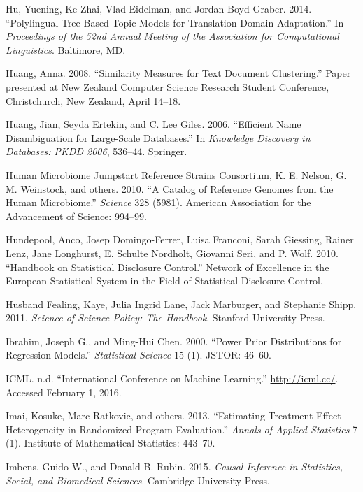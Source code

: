\documentclass[]{krantz}
\begin{document}
\hypertarget{ref-Hu:Zhai:Eidelman:Boyd-Graber-2014}{}
Hu, Yuening, Ke Zhai, Vlad Eidelman, and Jordan Boyd-Graber. 2014.
``Polylingual Tree-Based Topic Models for Translation Domain
Adaptation.'' In \emph{Proceedings of the 52nd Annual Meeting of the
Association for Computational Linguistics}. Baltimore, MD.

\hypertarget{ref-huang-08}{}
Huang, Anna. 2008. ``Similarity Measures for Text Document Clustering.''
Paper presented at New Zealand Computer Science Research Student
Conference, Christchurch, New Zealand, April 14--18.

\hypertarget{ref-HEG06}{}
Huang, Jian, Seyda Ertekin, and C. Lee Giles. 2006. ``Efficient Name
Disambiguation for Large-Scale Databases.'' In \emph{Knowledge Discovery
in Databases: PKDD 2006}, 536--44. Springer.

\hypertarget{ref-human2010catalog}{}
Human Microbiome Jumpstart Reference Strains Consortium, K. E. Nelson,
G. M. Weinstock, and others. 2010. ``A Catalog of Reference Genomes from
the Human Microbiome.'' \emph{Science} 328 (5981). American Association
for the Advancement of Science: 994--99.

\hypertarget{ref-hundepool2010handbook}{}
Hundepool, Anco, Josep Domingo-Ferrer, Luisa Franconi, Sarah Giessing,
Rainer Lenz, Jane Longhurst, E. Schulte Nordholt, Giovanni Seri, and P.
Wolf. 2010. ``Handbook on Statistical Disclosure Control.'' Network of
Excellence in the European Statistical System in the Field of
Statistical Disclosure Control.

\hypertarget{ref-husband2011science}{}
Husband Fealing, Kaye, Julia Ingrid Lane, Jack Marburger, and Stephanie
Shipp. 2011. \emph{Science of Science Policy: The Handbook}. Stanford
University Press.

\hypertarget{ref-ibrahim2000power}{}
Ibrahim, Joseph G., and Ming-Hui Chen. 2000. ``Power Prior Distributions
for Regression Models.'' \emph{Statistical Science} 15 (1). JSTOR:
46--60.

\hypertarget{ref-ICML}{}
ICML. n.d. ``International Conference on Machine Learning.''
\url{http://icml.cc/}. Accessed February 1, 2016.

\hypertarget{ref-imai2013estimating}{}
Imai, Kosuke, Marc Ratkovic, and others. 2013. ``Estimating Treatment
Effect Heterogeneity in Randomized Program Evaluation.'' \emph{Annals of
Applied Statistics} 7 (1). Institute of Mathematical Statistics:
443--70.

\hypertarget{ref-imbens2015causal}{}
Imbens, Guido W., and Donald B. Rubin. 2015. \emph{Causal Inference in
Statistics, Social, and Biomedical Sciences}. Cambridge University
Press.
\end{document}
